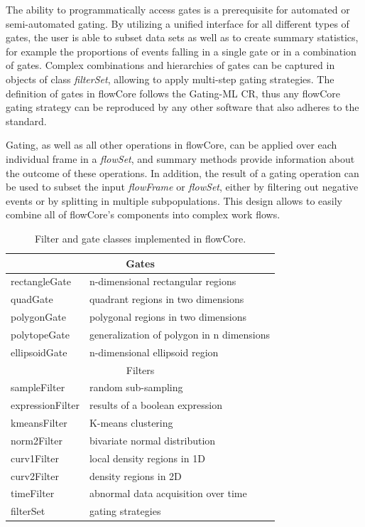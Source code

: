 \documentclass[12pt]{article}
\newcommand{\Rpackage}[1]{{\textsf{#1}}}
\newcommand{\Rclass}[1]{{\textit{#1}}}
\begin{document}
The ability to programmatically access gates is a prerequisite for
automated or semi-automated gating. By utilizing a unified interface
for all different types of gates, the user is able to subset data sets
as well as to create summary statistics, for example the proportions
of events falling in a single gate or in a combination of
gates. Complex combinations and hierarchies of gates can be captured
in objects of class \Rclass{filterSet}, allowing to apply multi-step
gating strategies. The definition of gates in \Rpackage{flowCore}
follows the Gating-ML CR, thus any \Rpackage{flowCore} gating strategy
can be reproduced by any other software that also adheres to the
standard.

Gating, as well as all other operations in flowCore, can be applied
over each individual frame in a \Rclass{flowSet}, and summary methods
provide information about the outcome of these operations. In
addition, the result of a gating operation can be used to subset the
input \Rclass{flowFrame} or \Rclass{flowSet}, either by filtering out
negative events or by splitting in multiple subpopulations. This
design allows to easily combine all of \Rpackage{flowCore}'s
components into complex work flows.

\begin{table}[ht]
\begin{center}
\begin{tabular}{|l|l|}
\hline
\multicolumn{2}{|c|}{Gates} \\
\hline
rectangleGate & n-dimensional rectangular regions \\
quadGate & quadrant regions in two dimensions \\
polygonGate & polygonal regions in two dimensions \\
polytopeGate & generalization of polygon in n dimensions \\
ellipsoidGate & n-dimensional ellipsoid region \\
\hline
\multicolumn{2}{|c|}{Filters} \\
\hline
sampleFilter & random sub-sampling\\
expressionFilter & results of a boolean expression \\
kmeansFilter & K-means clustering \\
norm2Filter & bivariate normal distribution \\
curv1Filter & local density regions in 1D \\
curv2Filter & density regions in 2D \\
timeFilter & abnormal data acquisition over time \\
\hline
filterSet & gating strategies \\
\hline
\end{tabular}
\caption{\label{table2}Filter and gate classes implemented in
  \Rpackage{flowCore}.}
\end{center}
\end{table}
\end{document}
